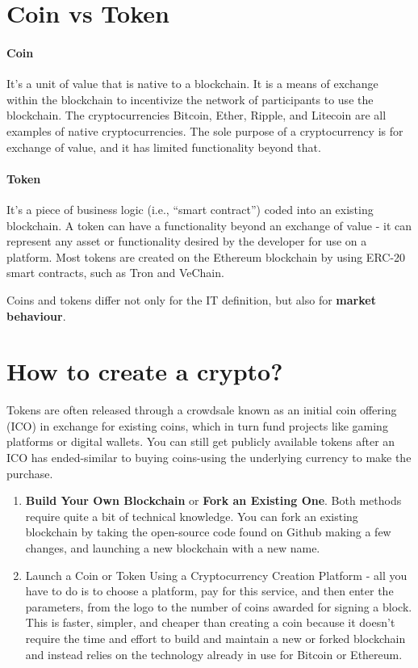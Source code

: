 
\section{Coin vs Token}

\paragraph{Coin} It's a unit of value that is native to a blockchain. It is a means of exchange within the blockchain to incentivize the network of participants to use the blockchain. The cryptocurrencies Bitcoin, Ether, Ripple, and Litecoin are all examples of native cryptocurrencies. The sole purpose of a cryptocurrency is for exchange of value, and it has limited functionality beyond that.

\paragraph{Token} It's a piece of business logic (i.e., ``smart contract'') coded into an existing blockchain. A token can have a functionality beyond an exchange of value - it can represent any asset or functionality desired by the developer for use on a platform. Most tokens are created on the Ethereum blockchain by using ERC-20 smart contracts, such as Tron and VeChain.

Coins and tokens differ not only for the IT definition, but also for \textbf{market behaviour}.

\section{How to create a crypto?}

Tokens are often released through a crowdsale known as an initial coin offering (ICO) in exchange for existing coins, which in turn fund projects like gaming platforms or digital wallets. You can still get publicly available tokens after an ICO has ended-similar to buying coins-using the underlying currency to make the purchase.

\begin{enumerate}
	\item \textbf{Build Your Own Blockchain} or \textbf{Fork an Existing One}. Both methods require quite a bit of technical knowledge. You can fork an existing blockchain by taking the open-source code found on Github making a few changes, and launching a new blockchain with a new name.
	\item Launch a Coin or Token Using a Cryptocurrency Creation Platform - all you have to do is to choose a platform, pay for this service, and then enter the parameters, from the logo to the number of coins awarded for signing a block.
	This is faster, simpler, and cheaper than creating a coin because it doesn't require the time and effort to build and maintain a new or forked blockchain and instead relies on the technology already in use for Bitcoin or Ethereum.
\end{enumerate}


